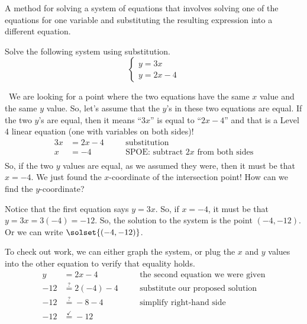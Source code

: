 \begin{boxdef}
A method for solving a system of equations that involves solving one of the equations for one variable and substituting the resulting expression into a different equation.
\end{boxdef}


\begin{boxex}
Solve the following system using substitution.
\[
\left\{%
\begin{array}{l}
y=3x\\
y=2x-4
\end{array}
\right.
\] 

\exsoln\ We are looking for a point where the two equations have the same $x$ value and the same $y$ value. So, let's assume that the $y$'s in these two equations  are equal. If the two $y$'s are equal, then it means ``$3x$'' is equal to ``$2x-4$'' and that is a Level 4 linear equation (one with variables on both sides)!
\[\begin{aligned}
3x &= 2x -4
&& \quad\text{substitution}\\
x &= -4
&& \quad\text{SPOE: subtract $2x$ from both sides}\\
\end{aligned}\]
So, if the two $y$ values are equal, as we assumed they were, then it must be that $x=-4$. We just found the $x$-coordinate of the intersection point! How can we find the $y$-coordinate?

Notice that the first equation says $y = 3x$. So, if $x=-4$, it must be that $y = 3x = 3(-4) = -12$. So, the solution to the system is the point $(-4, -12)$. Or we can write $\solset{(-4,-12)}$.

To check out work, we can either graph the system, or plug the $x$ and $y$ values into the other equation to verify that equality holds.
\[\begin{aligned}
y &= 2x -4
&& \quad\text{the second equation we were given}\\
-12 &\overset{?}{=} 2(-4)-4
&& \quad\text{substitute our proposed solution}\\
-12 &\overset{?}{=} -8-4
&& \quad\text{simplify right-hand side}\\
-12 &\overset{\checkmark}{=} -12
&& \quad\text{}\\
\end{aligned}\]
\end{boxex}


